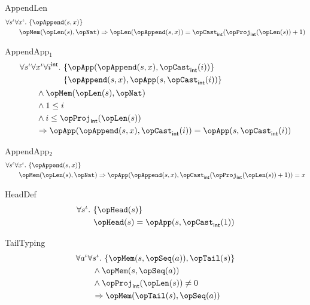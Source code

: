 \documentclass[11pt, a4paper, oneside]{article}
\begin{document}
\begin{axioms}
\item[AppendLen] \[
        \begin{aligned}
            &\forall s^\idv \forall x^\idv.\, \st{ \opAppend(s, x) } \\
            &\qquad \opMem(\opLen(s), \opNat) \imp \opLen(\opAppend(s, x)) = \opCast_\int(\opProj_\int(\opLen(s)) + 1)
        \end{aligned}
    \]

\item[AppendApp$_1$] \[
        \begin{aligned}
            &\forall s^\idv \forall x^\idv \forall i^\int.\, \begin{aligned}[t]
                &\st{ \opApp(\opAppend(s, x), \opCast_\int(i)) } \\
                &\st{ \opAppend(s, x), \opApp(s, \opCast_\int(i)) }
            \end{aligned} \\
            &\qquad \wedge \opMem(\opLen(s), \opNat) \\
            &\qquad \wedge 1 \le i \\
            &\qquad \wedge i \le \opProj_\int(\opLen(s)) \\
            &\qquad \imp \opApp(\opAppend(s, x), \opCast_\int(i)) = \opApp(s, \opCast_\int(i))
        \end{aligned}
    \]

\item[AppendApp$_2$] \[
        \begin{aligned}
            &\forall s^\idv \forall x^\idv.\, \st{ \opAppend(s, x) } \\
            &\qquad \opMem(\opLen(s), \opNat) \imp \opApp(\opAppend(s, x), \opCast_\int(\opProj_\int(\opLen(s)) + 1)) = x
        \end{aligned}
    \]

\item[HeadDef] \[
        \begin{aligned}
            &\forall s^\idv.\, \st{ \opHead(s) } \\
            &\qquad \opHead(s) = \opApp(s, \opCast_\int(1))
        \end{aligned}
    \]

\item[TailTyping] \[
        \begin{aligned}
            &\forall a^\idv \forall s^\idv.\, \st{ \opMem(s, \opSeq(a)), \opTail(s) } \\
            &\qquad \wedge \opMem(s, \opSeq(a)) \\
            &\qquad \wedge \opProj_\int(\opLen(s)) \neq 0 \\
            &\qquad \imp \opMem(\opTail(s), \opSeq(a))
        \end{aligned}
    \]


\end{axioms}
\end{document}
